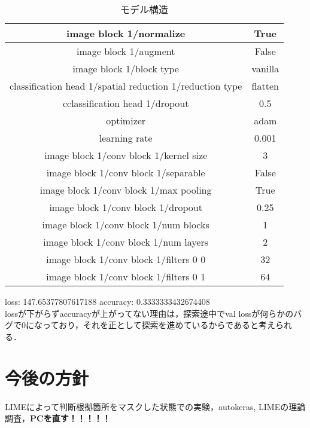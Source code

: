 \documentclass[11pt,a4j]{ujarticle} 			%
\begin{document}
	\begin{table}[h]
		\caption{モデル構造}
		\label{}
		\centering
		\begin{tabular}{c|c}
			\hline
			image block 1/normalize&True\\ \hline              
			image block 1/augment&False\\ \hline    
			image block 1/block type&vanilla\\ \hline         
			classification head 1/spatial reduction 1/reduction type&flatten\\ \hline
			cclassification head 1/dropout&0.5\\ \hline
			optimizer&adam\\ \hline              
			learning rate&0.001\\ \hline
			image block 1/conv block 1/kernel size&3\\ \hline
			image block 1/conv block 1/separable&False\\ \hline
			image block 1/conv block 1/max pooling&True\\ \hline
			image block 1/conv block 1/dropout&0.25\\ \hline
			image block 1/conv block 1/num blocks&1\\ \hline
			image block 1/conv block 1/num layers&2\\ \hline
			image block 1/conv block 1/filters 0 0&32\\ \hline
			image block 1/conv block 1/filters 0 1&64\\ \hline
		\end{tabular}
	\end{table}
	
	loss: 147.65377807617188
	accuracy: 0.3333333432674408 \\
	lossが下がらずaccuracyが上がってない理由は，探索途中でval lossが何らかのバグで0になっており，それを正として探索を進めているからであると考えられる．
	
	\section{今後の方針}
	LIMEによって判断根拠箇所をマスクした状態での実験，autokeras, LIMEの理論調査，\textbf{PCを直す！！！！！}
\end{document}
